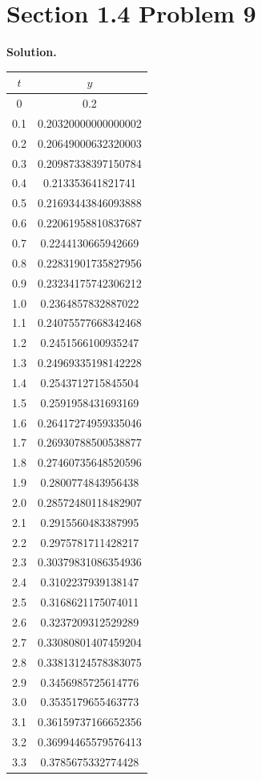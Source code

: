 \documentclass[11pt, letterpaper]{report}
\newenvironment{soln}[1][]{\noindent\textbf{Solution. }}{\hfill\qedsymbol}
\begin{document}
\section*{Section 1.4 Problem 9}
\begin{soln}
	\begin{center}
		\begin{tabular}{c|c}
			$t$ &$y$ \\
			\hline
			0&0.2\\
0.1&0.20320000000000002\\
0.2&0.20649000632320003\\
0.3&0.20987338397150784\\
0.4&0.213353641821741\\
0.5&0.21693443846093888\\
0.6&0.22061958810837687\\
0.7&0.2244130665942669\\
0.8&0.22831901735827956\\
0.9&0.23234175742306212\\
   1.0&0.2364857832887022\\
1.1&0.24075577668342468\\
1.2&0.2451566100935247\\
1.3&0.24969335198142228\\
1.4&0.2543712715845504\\
1.5&0.2591958431693169\\
1.6&0.26417274959335046\\
1.7&0.26930788500538877\\
1.8&0.27460735648520596\\
1.9&0.2800774843956438\\
2.0&0.28572480118482907\\
2.1&0.2915560483387995\\
2.2&0.2975781711428217\\
2.3&0.30379831086354936\\
2.4&0.3102237939138147\\
2.5&0.3168621175074011\\
2.6&0.3237209312529289\\
2.7&0.33080801407459204\\
2.8&0.33813124578383075\\
2.9&0.3456985725614776\\
3.0&0.3535179655463773\\
3.1&0.36159737166652356\\
3.2&0.36994465579576413\\
3.3&0.3785675332774428\\

\end{tabular}
\end{center}
\end{soln}
\end{document}
